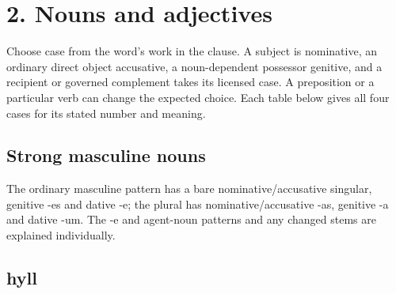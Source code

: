 

\section*{2. Nouns and adjectives}

Choose case from the word’s work in the clause. A subject is nominative, an ordinary direct object accusative, a noun-dependent possessor genitive, and a recipient or governed complement takes its licensed case. A preposition or a particular verb can change the expected choice. Each table below gives all four cases for its stated number and meaning.

\subsection*{Strong masculine nouns}

The ordinary masculine pattern has a bare nominative/\allowbreak{}accusative singular, genitive -es and dative -e; the plural has nominative/\allowbreak{}accusative -as, genitive -a and dative -um. The -e and agent-noun patterns and any changed stems are explained individually.

\subsection*{hyll}

